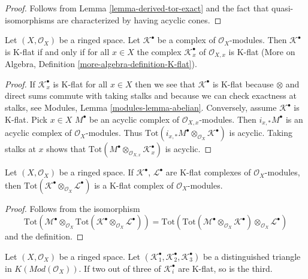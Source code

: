 \begin{proof}
Follows from
Lemma \ref{lemma-derived-tor-exact}
and the fact that quasi-isomorphisms are characterized by having
acyclic cones.
\end{proof}

\begin{lemma}
\label{lemma-check-K-flat-stalks}
Let $(X, \mathcal{O}_X)$ be a ringed space. Let $\mathcal{K}^\bullet$
be a complex of $\mathcal{O}_X$-modules. Then $\mathcal{K}^\bullet$
is K-flat if and only if for all $x \in X$ the complex
$\mathcal{K}_x^\bullet$ of $\mathcal{O}_{X, x}$ is K-flat
(More on Algebra, Definition \ref{more-algebra-definition-K-flat}).
\end{lemma}

\begin{proof}
If $\mathcal{K}_x^\bullet$ is K-flat for all $x \in X$ then we see
that $\mathcal{K}^\bullet$ is K-flat because $\otimes$ and
direct sums commute with taking stalks and because we can check exactness
at stalks, see
Modules, Lemma \ref{modules-lemma-abelian}.
Conversely, assume $\mathcal{K}^\bullet$ is K-flat. Pick $x \in X$
$M^\bullet$ be an acyclic complex of $\mathcal{O}_{X, x}$-modules.
Then $i_{x, *}M^\bullet$ is an acyclic complex of $\mathcal{O}_X$-modules.
Thus $\text{Tot}(i_{x, *}M^\bullet \otimes_{\mathcal{O}_X} \mathcal{K}^\bullet)$
is acyclic. Taking stalks at $x$ shows that
$\text{Tot}(M^\bullet \otimes_{\mathcal{O}_{X, x}} \mathcal{K}_x^\bullet)$
is acyclic.
\end{proof}

\begin{lemma}
\label{lemma-tensor-product-K-flat}
Let $(X, \mathcal{O}_X)$ be a ringed space.
If $\mathcal{K}^\bullet$, $\mathcal{L}^\bullet$ are K-flat complexes
of $\mathcal{O}_X$-modules, then
$\text{Tot}(\mathcal{K}^\bullet \otimes_{\mathcal{O}_X} \mathcal{L}^\bullet)$
is a K-flat complex of $\mathcal{O}_X$-modules.
\end{lemma}

\begin{proof}
Follows from the isomorphism
$$
\text{Tot}(\mathcal{M}^\bullet \otimes_{\mathcal{O}_X}
\text{Tot}(\mathcal{K}^\bullet \otimes_{\mathcal{O}_X} \mathcal{L}^\bullet))
=
\text{Tot}(\text{Tot}(\mathcal{M}^\bullet \otimes_{\mathcal{O}_X}
\mathcal{K}^\bullet) \otimes_{\mathcal{O}_X} \mathcal{L}^\bullet)
$$
and the definition.
\end{proof}

\begin{lemma}
\label{lemma-K-flat-two-out-of-three}
Let $(X, \mathcal{O}_X)$ be a ringed space.
Let $(\mathcal{K}_1^\bullet, \mathcal{K}_2^\bullet, \mathcal{K}_3^\bullet)$
be a distinguished triangle in $K(\textit{Mod}(\mathcal{O}_X))$.
If two out of three of $\mathcal{K}_i^\bullet$ are K-flat, so is the third.
\end{lemma}

